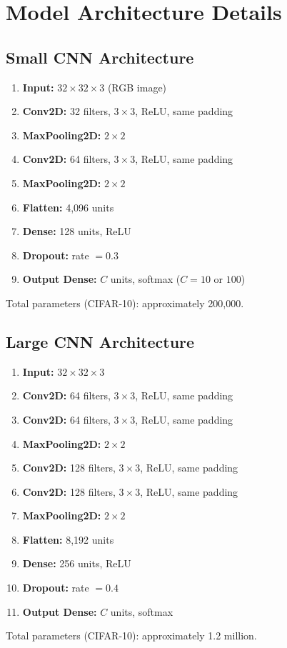 \documentclass[12pt, a4paper]{report}
\begin{document}
\chapter{Model Architecture Details}
\label{app:architecture}

\section{Small CNN Architecture}
\begin{enumerate}[leftmargin=2em, itemsep=2pt]
  \item \textbf{Input:} $32 \times 32 \times 3$ (RGB image)
  \item \textbf{Conv2D:} 32 filters, $3 \times 3$, ReLU, same padding
  \item \textbf{MaxPooling2D:} $2 \times 2$
  \item \textbf{Conv2D:} 64 filters, $3 \times 3$, ReLU, same padding
  \item \textbf{MaxPooling2D:} $2 \times 2$
  \item \textbf{Flatten:} 4,096 units
  \item \textbf{Dense:} 128 units, ReLU
  \item \textbf{Dropout:} rate $= 0.3$
  \item \textbf{Output Dense:} $C$ units, softmax ($C = 10$ or $100$)
\end{enumerate}
\noindent Total parameters (CIFAR-10): approximately 200,000.

\section{Large CNN Architecture}
\Needspace{9cm}
\begin{enumerate}[leftmargin=2em, itemsep=2pt]
  \item \textbf{Input:} $32 \times 32 \times 3$
  \item \textbf{Conv2D:} 64 filters, $3 \times 3$, ReLU, same padding
  \item \textbf{Conv2D:} 64 filters, $3 \times 3$, ReLU, same padding
  \item \textbf{MaxPooling2D:} $2 \times 2$
  \item \textbf{Conv2D:} 128 filters, $3 \times 3$, ReLU, same padding
  \item \textbf{Conv2D:} 128 filters, $3 \times 3$, ReLU, same padding
  \item \textbf{MaxPooling2D:} $2 \times 2$
  \item \textbf{Flatten:} 8,192 units
  \item \textbf{Dense:} 256 units, ReLU
  \item \textbf{Dropout:} rate $= 0.4$
  \item \textbf{Output Dense:} $C$ units, softmax
\end{enumerate}
\noindent Total parameters (CIFAR-10): approximately 1.2 million.
\end{document}
